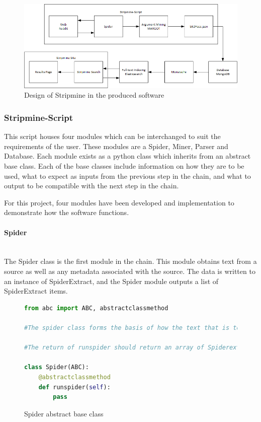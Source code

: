 \documentclass[12pt,a4paper]{article}
\begin{document}
\begin{figure}[H]
    \centering
    \includegraphics[scale=0.66]{Report/graphics/newdesign.png}
    \caption{Design of Stripmine in the produced software}
    \label{fig:newdesign}
\end{figure}

\subsubsection{Stripmine-Script}

This script houses four modules which can be interchanged to suit the requirements of the user. These modules are a Spider, Miner, Parser and Database. Each module exists as a python class which inherits from an abstract base class. Each of the base classes include information on how they are to be used, what to expect as inputs from the previous step in the chain, and what to output to be compatible with the next step in the chain. 

For this project, four modules have been developed and implementation to demonstrate how the software functions.

\paragraph{Spider}\mbox{}\\

The Spider class is the first module in the chain. This module obtains text from a source as well as any metadata associated with the source. The data is written to an instance of SpiderExtract, and the Spider module outputs a list of SpiderExtract items.

\begin{figure}[H]
    \centering
    \begin{lstlisting}[language=Python,firstnumber=1]
from abc import ABC, abstractclassmethod

#The spider class forms the basis of how the text that is to be mined is gathered

#The return of runspider should return an array of Spiderextract objects

class Spider(ABC):
    @abstractclassmethod
    def runspider(self):
        pass
\end{lstlisting}
    \caption{Spider abstract base class}
    \label{fig:ABC}
\end{figure}
\end{document}

